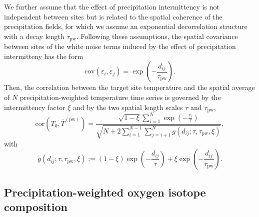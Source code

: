 \documentclass[cp, manuscript]{copernicus}
\begin{document}
We further assume that the effect of precipitation intermittency is not
independent between sites but is related to the spatial coherence of the
precipitation fields, for which we assume an exponential decorrelation structure
with a decay length $\tau_{\mathrm{pw}}$. Following these assumptions, the
spatial covariance between sites of the white noise terms induced by the effect
of precipitation intermitteny has the form
%
\begin{equation}
\label{eq:noise.cov}
\mathrm{cov}(\varepsilon_i,\varepsilon_j)=
\exp{\left(-\frac{d_{ij}}{\tau_{\mathrm{pw}}}\right)}.
\end{equation}
%
Then, the correlation between the target site temperature and the spatial
average of $N$ precipitation-weighted temperature time series is governed by the
intermittency factor $\xi$ and by the two spatial length scales $\tau$ and
$\tau_{\mathrm{pw}}$,
%
\begin{equation}
\label{eq:t2m.pw.corr}
\mathrm{cor}\left(T_0,\overline{T}^{\mathrm{(pw)}}\right)=
\frac
{\sqrt{1-\xi}\sum_{i=1}^{N}\exp{\left(-\frac{r_i}{\tau}\right)}}
{\sqrt{N + 2\sum_{i=1}^{N-1}\sum_{j=i+1}^{N}
  g(d_{ij}; \tau, \tau_{\mathrm{pw}}, \xi)}},
\end{equation}
%
with
\begin{equation}
\label{eq:exp.fun}
g(d_{ij}; \tau, \tau_{\mathrm{pw}}, \xi):=
(1-\xi)\exp{\left(-\frac{d_{ij}}{\tau}\right)} +
\xi\exp{\left(-\frac{d_{ij}}{\tau_{\mathrm{pw}}}\right)}.
\end{equation}

\subsection{Precipitation-weighted oxygen isotope composition}
\label{app:concept.model.oxy.pw}
\end{document}
